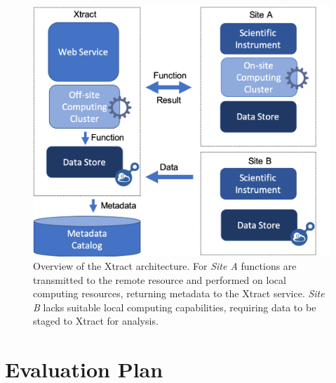 \documentclass[sigconf, 9pt]{acmart}
\newcommand{\tyler}[1]{}
\newcommand{\tyler}[1]{{\textcolor{cyan}{ tyler: #1 }}}
\newcommand{\name}{Xtract}
\begin{document}
\begin{figure}[t]
	\centering
	\includegraphics[scale=0.2]{figs/new-arch.png}
	\caption{Overview of the \name{} architecture. For \textit{Site A} functions are transmitted to the remote resource and performed on local computing resources, returning metadata to the \name{} service. \textit{Site B} lacks suitable local
	computing capabilities, requiring data to be staged to \name{} for analysis. \tyler{make more readable in smaller format}}
	\label{fig:arch}
\end{figure}



\section{Evaluation Plan}
\label{sec:eval}
\end{document}
